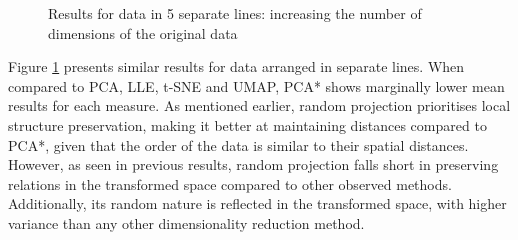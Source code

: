 \documentclass[pdftex,12pt,a4paper]{report}
\begin{document}
\begin{figure}[!htb]
    \hfill
    \caption{Results for data in 5 separate lines: increasing the number of dimensions of the original data}\label{fig:avg_dev_vs_high_dim-seplines}
\end{figure}

Figure \ref{fig:avg_dev_vs_high_dim-seplines} presents similar results for data arranged in separate lines.
When compared to PCA, LLE, t-SNE and UMAP, PCA* shows marginally lower mean results for each measure.
As mentioned earlier, random projection prioritises local structure preservation, making it better at maintaining distances compared to PCA*, given that the order of the data is similar to their spatial distances.
However, as seen in previous results, random projection falls short in preserving relations in the transformed space compared to other observed methods. 
Additionally, its random nature is reflected in the transformed space, with higher variance than any other dimensionality reduction method.
\end{document}

